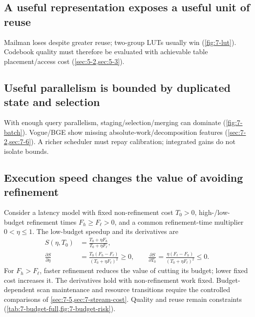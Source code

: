 \subsection{A useful representation exposes a useful unit of reuse}

Mailman loses despite greater reuse; two-group LUTs usually win (\cref{fig:7-lut}). Codebook quality must therefore be evaluated with achievable table placement/access cost (\cref{sec:5-2,sec:5-3}).

\subsection{Useful parallelism is bounded by duplicated state and selection}

With enough query parallelism, staging/selection/merging can dominate (\cref{fig:7-batch}). Vogue/BGE show missing absolute-work/decomposition features (\cref{sec:7-2,sec:7-6}). A richer scheduler must repay calibration; integrated gains do not isolate bounds.

\subsection{Execution speed changes the value of avoiding refinement}

Consider a latency model with fixed non-refinement cost $T_0>0$,
high-/low-budget refinement times $F_h\geq F_\ell>0$, and a common
refinement-time multiplier $0<\eta\leq1$. The low-budget speedup and
its derivatives are
\begin{align}
 S(\eta,T_0)&=\frac{T_0+\eta F_h}{T_0+\eta F_\ell},
 \label{eq:8-refinement-sensitivity}\\
 \frac{\partial S}{\partial\eta}
 &=\frac{T_0(F_h-F_\ell)}{(T_0+\eta F_\ell)^2}\geq0,\qquad
 \frac{\partial S}{\partial T_0}
 =\frac{\eta(F_\ell-F_h)}{(T_0+\eta F_\ell)^2}\leq0.\nonumber
\end{align}
For $F_h>F_\ell$, faster refinement reduces the value of cutting its
budget; lower fixed cost increases it. The derivatives hold with
non-refinement work fixed. Budget-dependent scan maintenance and
resource transitions require the controlled comparisons of
\cref{sec:7-5,sec:7-stream-cost}. Quality and reuse remain constraints
(\cref{tab:7-budget-full,fig:7-budget-risk}).
